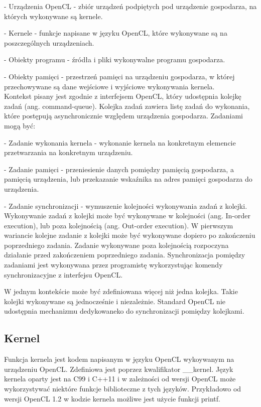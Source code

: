 - Urządzenia OpenCL - zbiór urządzeń podpiętych pod urządzenie gospodarza, na których wykonywane są kernele.

- Kernele - funkcje napisane w języku OpenCL, które wykonywane są na poszczególnych urządzeniach.

- Obiekty programu - źródła i pliki wykonywalne programu gospodarza.

- Obiekty pamięci - przestrzeń pamięci na urządzeniu gospodarza, w której przechowywane są dane wejściowe i wyjściowe wykonywania kernela.\\

Kontekst pisany jest zgodnie z interfejsem OpenCL, który udostępnia kolejkę zadań (ang. command-queue). Kolejka zadań zawiera listę zadań do wykonania, które postępują asynchronicznie względem urządzenia gospodarza. Zadaniami mogą być:

- Zadanie wykonania kernela - wykonanie kernela na konkretnym elemencie przetwarzania na konkretnym urządzeniu.

- Zadanie pamięci - przeniesienie danych pomiędzy pamięcią gospodarza, a pamięcią urządzenia, lub przekazanie wskaźnika na adres pamięci gospodarza do urządzenia.

- Zadanie synchronizacji - wymuszenie kolejności wykonywania zadań z kolejki.\\

Wykonywanie zadań z kolejki może być wykonywane w kolejności (ang. In-order execution), lub poza kolejnością (ang. Out-order execution). W pierwszym wariancie kolejne zadanie z kolejki może być wykonywane dopiero po zakończeniu poprzedniego zadania. Zadanie wykonywane poza kolejnością rozpoczyna działanie przed zakończeniem poprzedniego zadania. Synchronizacja pomiędzy zadaniami jest wykonywana przez programistę wykorzystując komendy synchronizacyjne z interfejsu OpenCL.

W jednym kontekście może być zdefiniowana więcej niż jedna kolejka. Takie kolejki wykonywane są jednocześnie i niezależnie. Standard OpenCL nie udostępnia mechanizmu dedykowaneko do synchronizacji pomiędzy kolejkami.


\subsection{Kernel}\label{sec:OpenC4L}

Funkcja kernela jest kodem napisanym w języku OpenCL wykoywanym na urządzeniu OpenCL. Zdefiniowa jest poprzez kwalifikator __kernel. Język kernela oparty jest na C99 i C++11 i w zależności od wersji OpenCL może wykorzystywać niektóre funkcje biblioteczne z tych języków. Przykładowo od wersji OpenCL 1.2 w kodzie kernela możliwe jest użycie funkcji printf.

